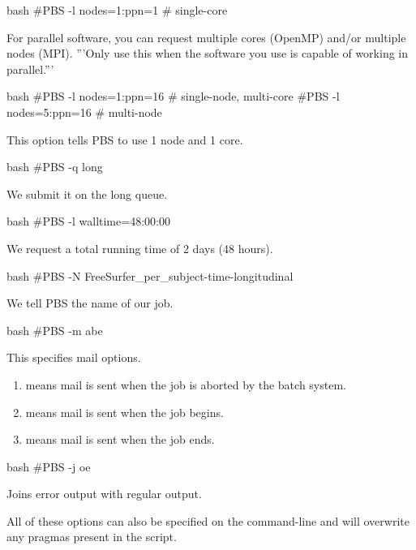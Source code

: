 \begin{code}{bash}
  #PBS -l nodes=1:ppn=1   # single-core
\end{code}

For parallel software, you can request multiple cores (OpenMP) and/or multiple
nodes (MPI). '''Only use this when the software you use is capable of working in
parallel.'''

\begin{code}{bash}
  #PBS -l nodes=1:ppn=16  # single-node, multi-core
  #PBS -l nodes=5:ppn=16  # multi-node
\end{code}

This option tells PBS to use 1 node and 1 core.

\begin{code}{bash}
  #PBS -q long
\end{code}

We submit it on the long queue.

\begin{code}{bash}
  #PBS -l walltime=48:00:00
\end{code}

We request a total running time of 2 days (48 hours).

\begin{code}{bash}
  #PBS -N FreeSurfer_per_subject-time-longitudinal
\end{code}

We tell PBS the name of our job.

\begin{code}{bash}
  #PBS -m abe
\end{code}

This specifies mail options.
\begin{enumerate}
\item {} means mail is sent when the job is aborted by the batch system.
\item {} means mail is sent when the job begins.
\item {} means mail is sent when the job ends.
\end{enumerate}

\begin{code}{bash}
  #PBS -j oe
\end{code}

Joins error output with regular output.

All of these options can also be specified on the command-line and will
overwrite any pragmas present in the script.

